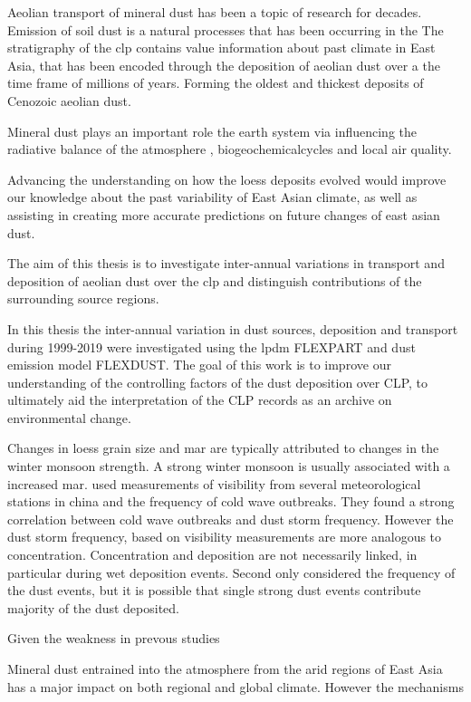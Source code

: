 
Aeolian transport of mineral dust has been a topic of research for decades. Emission of soil dust is a natural processes that has been occurring in the  
The stratigraphy of the \acrfull{clp} contains value information about past climate in East Asia, that has been encoded through the deposition of aeolian dust over a the time frame of millions of years. Forming the oldest and thickest deposits of Cenozoic aeolian dust.  


Mineral dust plays an important role the earth system via influencing the radiative balance of the atmosphere \parencite{choobari2014global,sun2012numerical, yin_interactions_2002}, biogeochemicalcycles \parencite{jickells_dust_biogeo_2015} and local air quality.   
 
 Advancing the understanding on how the loess deposits evolved would improve our knowledge about the past variability of East Asian climate, as well as assisting in creating more accurate predictions on future changes of east asian dust. 


The aim of this thesis is to investigate inter-annual variations in transport and deposition of aeolian dust over the \acrshort{clp} and distinguish contributions
of the surrounding source regions.

In this thesis the inter-annual variation in dust sources, deposition and transport during 1999-2019 were investigated using the \acrfull{lpdm} FLEXPART \parencite{Flexpart10.4_ref} and dust emission model FLEXDUST. The goal of this work is to improve our understanding of the controlling factors of the dust deposition over CLP, to ultimately aid the interpretation of the CLP records as an archive on environmental change.
 
Changes in loess grain size and \acrfull{mar} are typically attributed to changes in the winter monsoon strength. A strong winter monsoon is usually associated with a increased \acrshort{mar}. \textcite{wyrwoll2016cold} used measurements of visibility from several meteorological stations in china and the frequency of cold wave outbreaks. They found a strong correlation between cold wave outbreaks and dust storm frequency. However the dust storm frequency, based on visibility measurements are more analogous to concentration. Concentration and deposition are not necessarily linked, in particular during wet deposition events. Second \textcite{wyrwoll2016cold} only considered the frequency of the dust events, but it is possible that single strong dust events contribute majority of the dust deposited. 

Given the weakness in prevous studies 
\par Mineral dust entrained into the atmosphere from the arid regions of East Asia has a major impact on both regional and global climate. However the mechanisms 